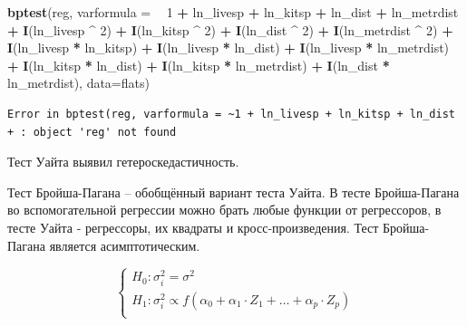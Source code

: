 \documentclass[]{book}
\newenvironment{Shaded}{\begin{snugshade}}{\end{snugshade}}
\newcommand{\DataTypeTok}[1]{\textcolor[rgb]{0.13,0.29,0.53}{#1}}
\newcommand{\DecValTok}[1]{\textcolor[rgb]{0.00,0.00,0.81}{#1}}
\newcommand{\KeywordTok}[1]{\textcolor[rgb]{0.13,0.29,0.53}{\textbf{#1}}}
\newcommand{\NormalTok}[1]{#1}
\newcommand{\OperatorTok}[1]{\textcolor[rgb]{0.81,0.36,0.00}{\textbf{#1}}}
\newcommand{\StringTok}[1]{\textcolor[rgb]{0.31,0.60,0.02}{#1}}
\begin{document}
\begin{Shaded}
\begin{Highlighting}[]
\KeywordTok{bptest}\NormalTok{(reg, }\DataTypeTok{varformula =} \OperatorTok{~}\StringTok{ }\DecValTok{1} \OperatorTok{+}\StringTok{ }\NormalTok{ln_livesp }\OperatorTok{+}\StringTok{ }\NormalTok{ln_kitsp }\OperatorTok{+}\StringTok{ }\NormalTok{ln_dist }\OperatorTok{+}\StringTok{ }\NormalTok{ln_metrdist }\OperatorTok{+}\StringTok{ }\KeywordTok{I}\NormalTok{(ln_livesp }\OperatorTok{^}\StringTok{ }\DecValTok{2}\NormalTok{) }\OperatorTok{+}\StringTok{ }\KeywordTok{I}\NormalTok{(ln_kitsp }\OperatorTok{^}\StringTok{ }\DecValTok{2}\NormalTok{) }\OperatorTok{+}\StringTok{ }\KeywordTok{I}\NormalTok{(ln_dist }\OperatorTok{^}\StringTok{ }\DecValTok{2}\NormalTok{) }\OperatorTok{+}\StringTok{ }\KeywordTok{I}\NormalTok{(ln_metrdist }\OperatorTok{^}\StringTok{ }\DecValTok{2}\NormalTok{) }\OperatorTok{+}\StringTok{ }\KeywordTok{I}\NormalTok{(ln_livesp }\OperatorTok{*}\StringTok{ }\NormalTok{ln_kitsp) }\OperatorTok{+}\StringTok{ }\KeywordTok{I}\NormalTok{(ln_livesp }\OperatorTok{*}\StringTok{ }\NormalTok{ln_dist) }\OperatorTok{+}\StringTok{ }\KeywordTok{I}\NormalTok{(ln_livesp }\OperatorTok{*}\StringTok{ }\NormalTok{ln_metrdist) }\OperatorTok{+}\StringTok{ }\KeywordTok{I}\NormalTok{(ln_kitsp }\OperatorTok{*}\StringTok{ }\NormalTok{ln_dist) }\OperatorTok{+}\StringTok{ }\KeywordTok{I}\NormalTok{(ln_kitsp }\OperatorTok{*}\StringTok{ }\NormalTok{ln_metrdist) }\OperatorTok{+}\StringTok{ }\KeywordTok{I}\NormalTok{(ln_dist }\OperatorTok{*}\StringTok{ }\NormalTok{ln_metrdist), }\DataTypeTok{data=}\NormalTok{flats)}
\end{Highlighting}
\end{Shaded}

\begin{verbatim}
Error in bptest(reg, varformula = ~1 + ln_livesp + ln_kitsp + ln_dist + : object 'reg' not found
\end{verbatim}

Тест Уайта выявил гетероскедастичность.

Тест Бройша-Пагана -- обобщённый вариант теста Уайта. В тесте Бройша-Пагана во вспомогательной регрессии можно брать любые функции от регрессоров, в тесте Уайта - регрессоры, их квадраты и кросс-произведения. Тест Бройша-Пагана является асимптотическим.

\[
\begin{cases}
H_0: \sigma^2_i = \sigma^2 \\
H_1: \sigma^2_i \propto f(\alpha_0 + \alpha_1 \cdot Z_1 +  \ldots + \alpha_p \cdot Z_p) \\
\end{cases}
\]
\end{document}
